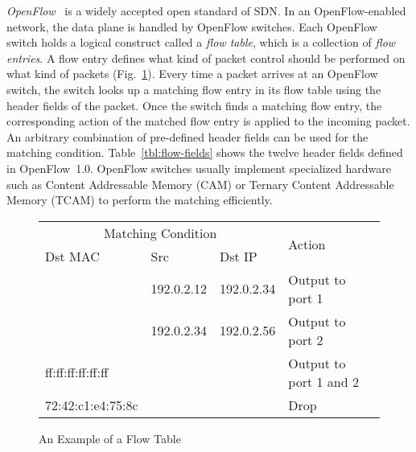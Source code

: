 \emph{OpenFlow}~\autocite{McKeown2008} is a widely accepted open standard of
SDN\@. In an OpenFlow-enabled network, the data plane is handled by OpenFlow
switches. Each OpenFlow switch holds a logical construct called a \emph{flow
table}, which is a collection of \emph{flow entries}. A flow entry defines
what kind of packet control should be performed on what kind of packets
(Fig.~\ref{tbl:flow-table}). Every time a packet arrives at an OpenFlow
switch, the switch looks up a matching flow entry in its flow table using the
header fields of the packet. Once the switch finds a matching flow entry, the
corresponding action of the matched flow entry is applied to the incoming
packet. An arbitrary combination of pre-defined header fields can be used for
the matching condition. Table~\ref{tbl:flow-fields} shows the twelve header
fields defined in OpenFlow~1.0. OpenFlow switches usually implement
specialized hardware such as Content Addressable Memory (CAM) or Ternary
Content Addressable Memory (TCAM) to perform the matching efficiently.

\begin{figure}
\centering
\begin{tabular}{@{}lllll@{}}
\toprule
\multicolumn{3}{c}{Matching Condition} & \multirow{2}{*}{Action} \\ \cmidrule(){1-3}
Dst MAC     & Src     & Dst IP    &                         \\ \midrule
                  & 192.0.2.12 & 192.0.2.34  & Output to port 1         \\
                  & 192.0.2.34 & 192.0.2.56  & Output to port 2         \\
ff:ff:ff:ff:ff:ff &            &             & Output to port 1 and 2   \\
72:42:c1:e4:75:8c &            &             & Drop                     \\
\bottomrule
\end{tabular}
\caption{An Example of a Flow Table}%
\label{tbl:flow-table}
\end{figure}

